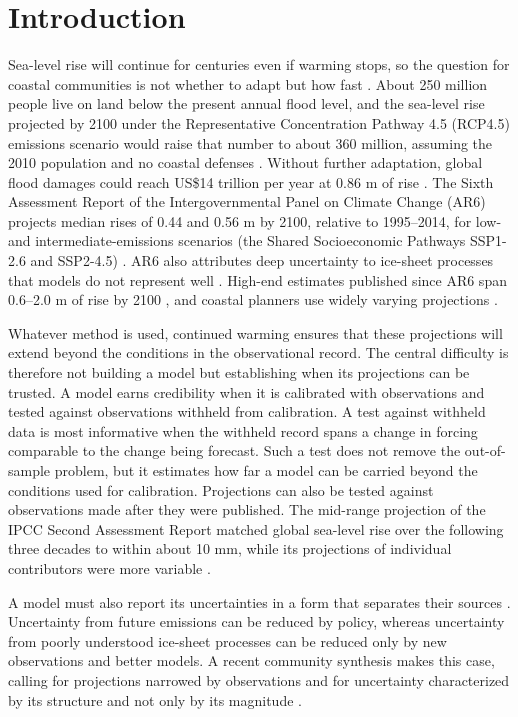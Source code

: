 \documentclass[draft,linenumbers]{agujournal2025}
\begin{document}

\section{Introduction}

Sea-level rise will continue for centuries even if warming stops, so the question for coastal communities is not whether to adapt but how fast \citep{Fox-Kemper2021}. About 250 million people live on land below the present annual flood level, and the sea-level rise projected by 2100 under the Representative Concentration Pathway 4.5 (RCP4.5) emissions scenario would raise that number to about 360 million, assuming the 2010 population and no coastal defenses \citep{Kulp2019}. Without further adaptation, global flood damages could reach US\$14 trillion per year at 0.86 m of rise \citep{Jevrejeva2018}. The Sixth Assessment Report of the Intergovernmental Panel on Climate Change (AR6) projects median rises of 0.44 and 0.56 m by 2100, relative to 1995--2014, for low- and intermediate-emissions scenarios (the Shared Socioeconomic Pathways SSP1-2.6 and SSP2-4.5) \citep{Fox-Kemper2021}. AR6 also attributes deep uncertainty to ice-sheet processes that models do not represent well \citep{Fox-Kemper2021}. High-end estimates published since AR6 span 0.6--2.0 m of rise by 2100 \citep{Garner2026}, and coastal planners use widely varying projections \citep{Hirschfeld2023}.

Whatever method is used, continued warming ensures that these projections will extend beyond the conditions in the observational record. The central difficulty is therefore not building a model but establishing when its projections can be trusted. A model earns credibility when it is calibrated with observations and tested against observations withheld from calibration. A test against withheld data is most informative when the withheld record spans a change in forcing comparable to the change being forecast. Such a test does not remove the out-of-sample problem, but it estimates how far a model can be carried beyond the conditions used for calibration. Projections can also be tested against observations made after they were published. The mid-range projection of the IPCC Second Assessment Report matched global sea-level rise over the following three decades to within about 10 mm, while its projections of individual contributors were more variable \citep{Tornqvist2025}.

A model must also report its uncertainties in a form that separates their sources \citep{Aschwanden2021}. Uncertainty from future emissions can be reduced by policy, whereas uncertainty from poorly understood ice-sheet processes can be reduced only by new observations and better models. A recent community synthesis makes this case, calling for projections narrowed by observations and for uncertainty characterized by its structure and not only by its magnitude \citep{Felikson2025}.
\end{document}
